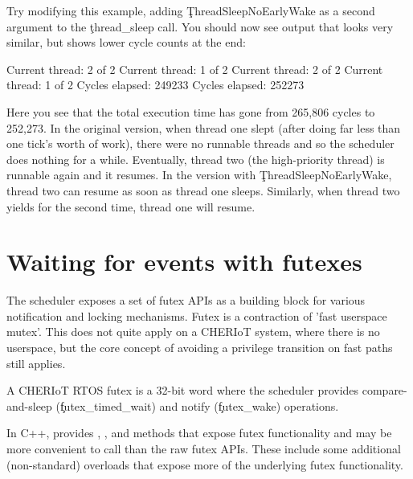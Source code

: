 Try modifying this example, adding \c{ThreadSleepNoEarlyWake}  as a second argument to the \c{thread_sleep} call.
You should now see output that looks very similar, but shows lower cycle counts at the end:

\begin{console}
Current thread: 2 of 2
Current thread: 1 of 2
Current thread: 2 of 2
Current thread: 1 of 2
Cycles elapsed: 249233
Cycles elapsed: 252273
\end{console}

Here you see that the total execution time has gone from 265,806 cycles to 252,273.
In the original version, when thread one slept (after doing far less than one tick's worth of work), there were no runnable threads and so the scheduler does nothing for a while.
Eventually, thread two (the high-priority thread) is runnable again and it resumes.
In the version with \c{ThreadSleepNoEarlyWake}, thread two can resume as soon as thread one sleeps.
Similarly, when thread two yields for the second time, thread one will resume.

\section[label=futex]{Waiting for events with futexes}

The scheduler exposes a set of futex APIs as a building block for various notification and locking mechanisms.
Futex is a contraction of 'fast userspace mutex'.
This does not quite apply on a CHERIoT system, where there is no userspace, but the core concept of avoiding a privilege transition on fast paths still applies.

A CHERIoT RTOS futex is a 32-bit word where the scheduler provides compare-and-sleep (\c{futex_timed_wait}) and notify (\c{futex_wake}) operations.



\begin{note}
	In C++,  provides , , and  methods that expose futex functionality and may be more convenient to call than the raw futex APIs.
	These include some additional (non-standard) overloads that expose more of the underlying futex functionality.
\end{note}

